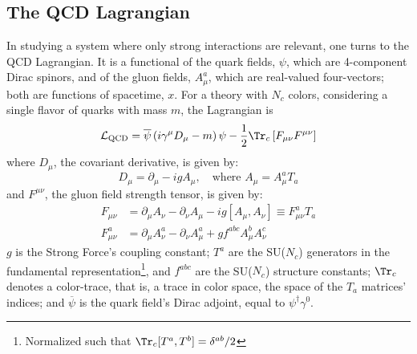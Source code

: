 \chapter{}

\section{The QCD Lagrangian}

In studying a system where only strong interactions are relevant, one turns to the QCD Lagrangian. It is a functional of the quark fields, $\psi$, which are 4-component Dirac spinors, and of the gluon fields, $A^a_\mu$, which are real-valued four-vectors; both are functions of spacetime, $x$. For a theory with $N_c$ colors, considering a single flavor of quarks with mass $m$,
the Lagrangian is
\begin{equation}
	\mathcal{L}_\text{QCD} = \overline{\psi} \left(i \gamma^\mu D_\mu - m \right) \psi - \frac{1}{2} \Tr_c \left[ F_{\mu \nu} F^{\mu \nu} \right] %
	\label{eq:QCD_Lagrangian}
\end{equation}
where $D_\mu$, the covariant derivative, is given by:
\begin{equation}
	D_\mu =  \partial_\mu - i g A_\mu, \quad \text{where }  A_\mu = A_\mu^a T_a
\end{equation}
and $F^{\mu \nu}$, the gluon field strength tensor, is given by:
\begin{equation}
	\begin{split}
		F_{\mu \nu} & = \partial_\mu A_\nu - \partial_\nu A_\mu - ig [A_\mu, A_\nu] \equiv F_{\mu \nu}^a T_a\\
		F_{\mu \nu}^a & = \partial_\mu A_\nu^a - \partial_\nu A_\mu^a + g f^{a b c} A^b_\mu A^c_\nu
	\end{split}
\end{equation}
$g$ is the Strong Force's coupling constant; $T^a$ are the SU($N_c$) generators in the fundamental representation\footnote{Normalized such that $\Tr_c [T^a, T^b] = \delta^{ab}/2$}, and $f^{abc}$ are the SU($N_c$) structure constants; $\Tr_c$ denotes a color-trace, that is, a trace in color space, the space of the $T_a$ matrices' indices; and $\overline{\psi}$ is the quark field's Dirac adjoint, equal to $ \psi^\dagger \gamma^0$.

